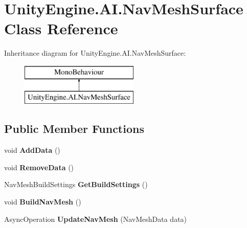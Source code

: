 \hypertarget{class_unity_engine_1_1_a_i_1_1_nav_mesh_surface}{}\section{Unity\+Engine.\+A\+I.\+Nav\+Mesh\+Surface Class Reference}
\label{class_unity_engine_1_1_a_i_1_1_nav_mesh_surface}
Inheritance diagram for Unity\+Engine.\+A\+I.\+Nav\+Mesh\+Surface\+:\begin{figure}[H]
\begin{center}
\leavevmode
\includegraphics[height=2.000000cm]{class_unity_engine_1_1_a_i_1_1_nav_mesh_surface}
\end{center}
\end{figure}
\subsection*{Public Member Functions}
\begin{DoxyCompactItemize}
\item 
\mbox{\label{class_unity_engine_1_1_a_i_1_1_nav_mesh_surface_a59cb54cd1345b7f9f5ec569740249fbc}} 
void {\bfseries Add\+Data} ()
\item 
\mbox{\label{class_unity_engine_1_1_a_i_1_1_nav_mesh_surface_ab172d2aeaa1fc33361ec519b34e30bda}} 
void {\bfseries Remove\+Data} ()
\item 
\mbox{\label{class_unity_engine_1_1_a_i_1_1_nav_mesh_surface_a29b3013714ce2cb0f40489b0094cde15}} 
Nav\+Mesh\+Build\+Settings {\bfseries Get\+Build\+Settings} ()
\item 
\mbox{\label{class_unity_engine_1_1_a_i_1_1_nav_mesh_surface_aadb98970a0eab4c02bf9d9b5fced4393}} 
void {\bfseries Build\+Nav\+Mesh} ()
\item 
\mbox{\label{class_unity_engine_1_1_a_i_1_1_nav_mesh_surface_afe022e3ea5130431bae0366ff2df756a}} 
Async\+Operation {\bfseries Update\+Nav\+Mesh} (Nav\+Mesh\+Data data)
\end{DoxyCompactItemize}

